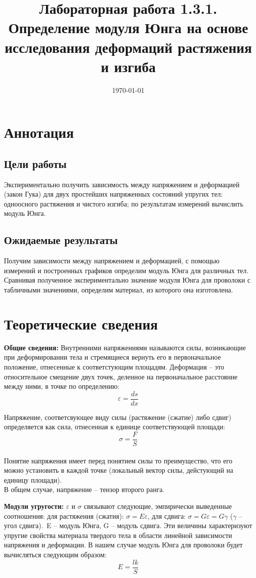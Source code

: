 \documentclass[a4paper,12pt]{article} %
\date{\today}
\title{Лабораторная работа 1.3.1. Определение модуля Юнга на основе
исследования деформаций растяжения и изгиба}
\date{}
\begin{document}
\maketitle
\section{Аннотация}
\subsection{Цели работы}
Экспериментально получить зависимость между напряжением и деформацией (закон Гука) для двух простейших напряженных состояний упругих тел: одноосного растяжения и чистого изгиба; по результатам измерений вычислить модуль Юнга.
\subsection{Ожидаемые результаты}
Получим зависимости между напряжением и деформацией, с помощью измерений и построенных графиков определим модуль Юнга для различных тел. Сравнивая полученное экспериментально значение модуля Юнга для проволоки с табличными значениями, определим материал, из которого она изготовлена.
\section{Теоретические сведения}
\textbf{Общие сведения:}
Внутренними напряжениями называются силы, возникающие при деформировании тела и стремящиеся вернуть его в первоначальное положение, отнесенные к соответстующим площадям.
Деформация -- это относительное смещение двух точек, деленное на первоначальное расстояние между ними, в точке по определению: \[\varepsilon = \frac{ds}{dx}\]

Напряжение, соответсвующее виду силы (растяжение (сжатие) либо сдвиг) определяется как сила, отнесенная к единице соответствующей площади: \[\sigma = \frac{F}{S}\]\\
Понятие напряжения имеет перед понятием силы то преимущество, что его можно установить в каждой точке (локальный вектор силы, дейстующий на единицу площади).\\
В общем случае, напряжение -- тензор второго ранга.

\textbf{Модули угругости:}
\(\varepsilon\) и \(\sigma\) связывают следующие, эмпирически выведенные соотношения:
для растяжения (сжатия): \(\sigma = E\varepsilon\), для сдвига: \(\sigma = G\varepsilon = G\gamma\)   (\(\gamma\) -- угол сдвига).\
E -- модуль Юнга, G -- модуль сдвига. Эти величины характеризуют упругие свойства материала твердого тела в области линейной зависимости напряжения и деформации. В нашем случае модуль Юнга для проволоки будет вычисляться следующим образом: \[E = \frac{lk}{S}\]
\end{document}
